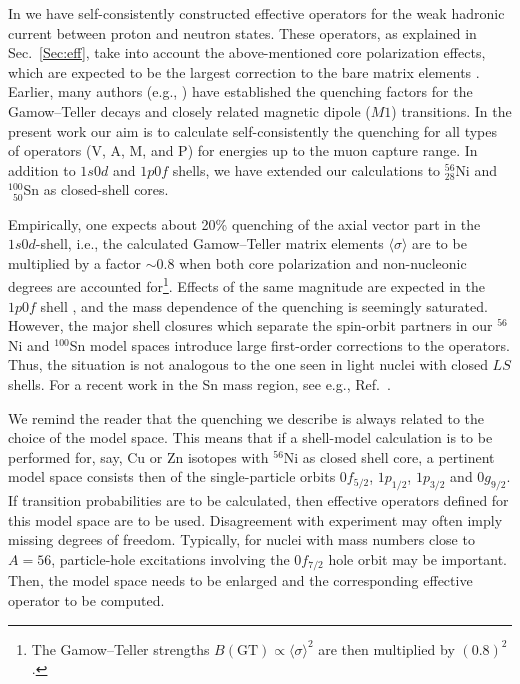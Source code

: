 In \cite{sii99,sii99j} we have self-consistently constructed effective
operators for the weak hadronic current between proton and neutron
states. These operators, as explained in Sec.\ \ref{Sec:eff}, take into
account the above-mentioned core polarization effects, which are expected
to be the largest correction to the bare matrix elements \cite{cas90}. 
Earlier, many authors (e.g., \cite{tow87,bro87,bro88,mar96}) have
established the quenching factors for the Gamow--Teller decays and
closely related magnetic dipole ($M1$) transitions.
In the present work our aim is to calculate self-consistently the
quenching for all types of operators (V, A, M, and P) for energies up to
the muon capture range. In addition to 
$1s0d$ and $1p0f$ shells, we have extended our calculations to 
$^{56}_{28}$Ni and $^{100}_{\phantom{1}50}$Sn as closed-shell cores.

Empirically, one expects about 20\% quenching of the axial vector part in
the $1s0d$-shell, i.e., the calculated Gamow--Teller matrix elements $\langle
\sigma\rangle$
are to be multiplied by a factor $\sim 0.8$ \cite{bro88} when both core 
polarization and 
non-nucleonic degrees are accounted for\footnote{The Gamow--Teller strengths
$B(\mathrm{GT})\propto\langle\sigma\rangle^2$ are then multiplied by 
$(0.8)^2$.}. Effects of the same magnitude are 
expected in the $1p0f$ shell \cite{mar96}, and the mass dependence of the 
quenching is seemingly saturated. However,
the major shell closures which separate the spin-orbit partners
in our $^{56}$Ni and $^{100}$Sn     
model spaces introduce large first-order corrections to
the operators. Thus, the situation is not analogous to the one seen in
light nuclei with closed $LS$ shells. For a recent work in the Sn mass region, 
see e.g., Ref.~\cite{kar98}.

We remind the reader that the quenching we describe is always 
related to the choice of the model space. This means that if a shell-model
calculation is to be performed for, say, Cu or Zn isotopes with 
$^{56}$Ni as closed shell core,  a pertinent model space consists then
of the  single-particle orbits $0f_{5/2}$, $1p_{1/2}$, $1p_{3/2}$ and
$0g_{9/2}$. If transition probabilities are to be calculated,
then effective operators defined for this model space are to be used. 
Disagreement with experiment may often imply missing degrees of freedom.
Typically, for nuclei with mass numbers close to $A=56$, particle-hole
excitations involving the $0f_{7/2}$ hole orbit may be important.
Then, the model space needs to be enlarged and the corresponding
effective operator to be computed. 

